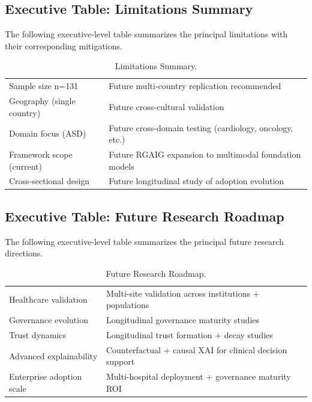 \subsection{Executive Table: Limitations Summary}
\label{sec:exec_limitations_summary}

\noindent The following executive-level table summarizes the principal limitations with their corresponding mitigations.

{\tablestripes\tablefontsize
{}
\begin{xltabular}{\textwidth}{@{} >{\raggedright\arraybackslash}p{6cm} L @{}}
\caption[Limitations Summary]{Limitations Summary.}\label{tab:exec_limitations_summary} \\
\toprule
{} &  \\
\midrule
\endfirsthead
\endhead
\bottomrule
\endlastfoot
Sample size n=131 & Future multi-country replication recommended \\
\addlinespace
Geography (single country) & Future cross-cultural validation \\
\addlinespace
Domain focus (ASD) & Future cross-domain testing (cardiology, oncology, etc.) \\
\addlinespace
Framework scope (current) & Future RGAIG expansion to multimodal foundation models \\
\addlinespace
Cross-sectional design & Future longitudinal study of adoption evolution \\
\end{xltabular}}


\subsection{Executive Table: Future Research Roadmap}
\label{sec:exec_future_research_roadmap}

\noindent The following executive-level table summarizes the principal future research directions.

{\tablestripes\tablefontsize
{}
\begin{xltabular}{\textwidth}{@{} >{\raggedright\arraybackslash}p{6cm} L @{}}
\caption[Future Research Roadmap]{Future Research Roadmap.}\label{tab:exec_future_research_roadmap} \\
\toprule
{} &  \\
\midrule
\endfirsthead
\endhead
\bottomrule
\endlastfoot
Healthcare validation & Multi-site validation across institutions + populations \\
\addlinespace
Governance evolution & Longitudinal governance maturity studies \\
\addlinespace
Trust dynamics & Longitudinal trust formation + decay studies \\
\addlinespace
Advanced explainability & Counterfactual + causal XAI for clinical decision support \\
\addlinespace
Enterprise adoption scale & Multi-hospital deployment + governance maturity ROI \\
\end{xltabular}}


